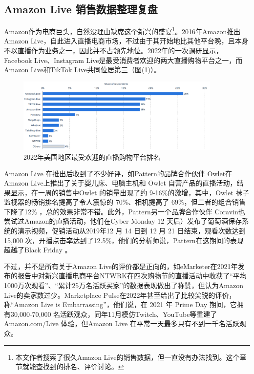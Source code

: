 \documentclass[12pt]{ctexart}
\begin{document}
\subsection{Amazon Live 销售数据整理复盘}

Amazon作为电商巨头，自然没理由缺席这个新兴的盛宴\footnote{本文作者搜索了很久Amazon Live的销售数据，但一直没有办法找到。这个章节就能查找到的排名、评价讨论。}。2016年Amazon推出Amazon Live，自此进入直播电商市场，不过由于其开始地比其他平台晚，且本身不以直播作为业务之一，因此并不占领先地位。2022年的一次调研显示，Facebook Live、Instagram Live是最受消费者欢迎的两大直播购物平台之一，而Amazon Live和TikTok Live共同位居第三（图(\ref{popu})）。

\begin{figure}[htbp!]
    \centering
    \includegraphics[width=0.9\textwidth]{Images/4.png}
    \caption{2022年美国地区最受欢迎的直播购物平台排名 \cite{4}}
    \label{popu}
\end{figure}

Amazon Live 在推出后收到了不少好评，如Pattern的品牌合作伙伴 Owlet在Amazon Live上推出了关于婴儿床、电脑主机和 Owlet 自营产品的直播活动，结果显示，在一周的销售中Owlet 的销量出现了约 9-16\%的激增，其中，Owlet 袜子监视器的畅销排名提高了令人震惊的 70\%、相机提高了 69\%，但二者的组合销售下降了12\% \cite{5}，总的效果非常不错。此外，Pattern另一个品牌合作伙伴 Coravin也尝试过Amazon的直播活动，他们在Cyber Monday 12 天后）发布了葡萄酒保存系统的演示视频，促销活动从2019年12 月 14 日到 12 月 21 日结束，观看次数达到 15,000 次，开播点击率达到了12.5\%，他们的分析师说，Pattern在这期间的表现超越了Black Friday \cite{6}。

不过，并不是所有关于Amazon Live的评价都是正向的，如eMarketer在2021年发布的报告中对新兴直播电商平台NTWRK在四次购物节的直播活动中收获了“平均1000万次观看”、“累计25万名活跃买家”的数据表现做出了称赞，但认为Amazon Live的卖家数过少\cite{7}。Marketplace Pulse在2022年甚至给出了比较尖锐的评价，称“Amazon Live is Embarrassing”，他们说，在 2021 年 Prime Day 期间，它拥有30,000-70,000 名活跃观众，同年11月模仿Twitch、YouTube等重建了 Amazon.com/Live 体验，但Amazon Live 在平常一天最多只有不到一千名活跃观众\cite{8}。
\end{document}
